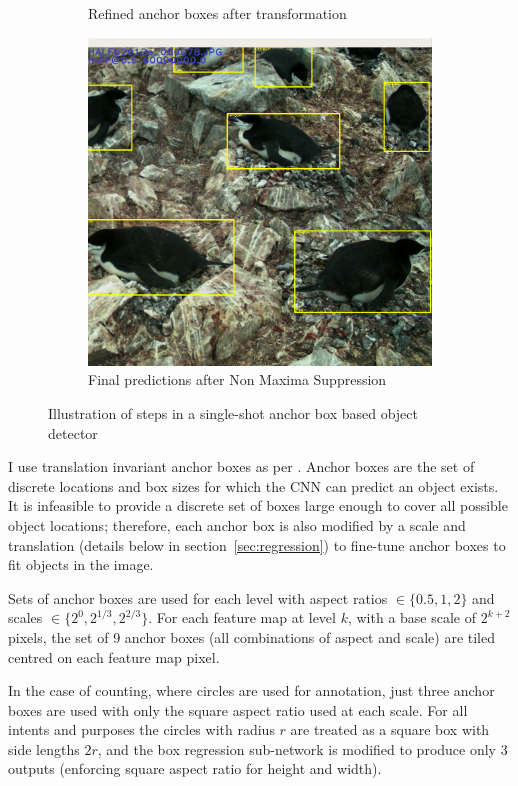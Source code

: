 \begin{figure}
\begin{subfigure}[t]{0.30\textwidth}
  \caption{Refined anchor boxes after transformation}
  \end{subfigure}%
  \begin{subfigure}[t]{0.32\textwidth}
  \includegraphics[width=0.95\linewidth]{figures/object/final.png}
  \caption{Final predictions after Non Maxima Suppression}
  \end{subfigure}%
  \caption{Illustration of steps in a single-shot anchor box based object detector }
  \label{fig:anchor_boxes}
\end{figure}


I use translation invariant anchor boxes as per \cite{Wang2017}. Anchor boxes are the set of discrete locations and box sizes for which the \gls{CNN} can predict an object exists. It is infeasible to provide a discrete set of boxes large enough to cover all possible object locations; therefore, each anchor box is also modified by a scale and translation (details below in section~\ref{sec:regression}) to fine-tune anchor boxes to fit objects in the image.

Sets of anchor boxes are used for each level with aspect ratios $ \in \{0.5, 1, 2\} $ and scales $ \in \{2^0, 2^{1/3}, 2^{2/3}\} $. For each feature map at level $k$, with a base scale of $ 2^{k + 2} $ pixels, the set of 9 anchor boxes (all combinations of aspect and scale) are tiled centred on each feature map pixel. 

In the case of counting, where circles are used for annotation, just three anchor boxes are used with only the square aspect ratio used at each scale. For all intents and purposes the circles with radius $r$ are treated as a square box with side lengths $2r$, and the box regression sub-network is modified to produce only $3$ outputs (enforcing square aspect ratio for height and width).

